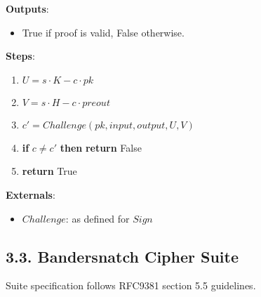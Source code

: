 \documentclass[
]{article}
\providecommand{\tightlist}{%
  \setlength{\itemsep}{0pt}\setlength{\parskip}{0pt}}
\begin{document}
\textbf{Outputs}:

\begin{itemize}
\tightlist
\item
  True if proof is valid, False otherwise.
\end{itemize}

\textbf{Steps}:

\begin{enumerate}
\def\labelenumi{\arabic{enumi}.}
\tightlist
\item
  \(U = s \cdot K - c \cdot pk\)
\item
  \(V = s \cdot H - c \cdot preout\)
\item
  \(c' = Challenge(pk, input, output, U, V)\)
\item
  \textbf{if} \(c \neq c'\) \textbf{then} \textbf{return} False
\item
  \textbf{return} True
\end{enumerate}

\textbf{Externals}:

\begin{itemize}
\tightlist
\item
  \(Challenge\): as defined for \(Sign\)
\end{itemize}

\hypertarget{bandersnatch-cipher-suite}{%
\subsection{3.3. Bandersnatch Cipher
Suite}\label{bandersnatch-cipher-suite}}

Suite specification follows RFC9381 section 5.5 guidelines.
\end{document}

